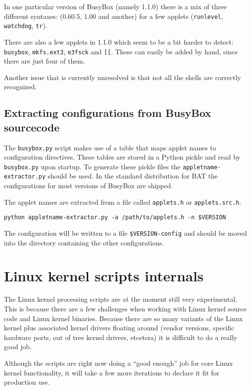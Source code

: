 \documentclass[10pt]{article}
\begin{document}
In one particular version of BusyBox (namely 1.1.0) there is a mix of three
different syntaxes: (0.60.5, 1.00 and another) for a few applets
(\texttt{runlevel}, \texttt{watchdog}, \texttt{tr}).

There are also a few applets in 1.1.0 which seem to be a bit harder to detect:
\texttt{busybox}, \texttt{mkfs.ext3}, \texttt{e3fsck} and \texttt{[[}. These
can easily be added by hand, since there are just four of them.

Another issue that is currently unresolved is that not all the shells are
correctly recognized.

\subsection{Extracting configurations from BusyBox sourcecode}

The \texttt{busybox.py} script makes use of a table that maps applet names to
configuration directives. These tables are stored in a Python pickle and read
by \texttt{busybox.py} upon startup. To generate these pickle files the
\texttt{appletname-extractor.py} should be used. In the standard distribution
for BAT the configurations for most versions of BusyBox are shipped.

The applet names are extracted from a file called \texttt{applets.h} or
\texttt{applets.src.h}.

\begin{verbatim}
python appletname-extractor.py -a /path/to/applets.h -n $VERSION
\end{verbatim}

The configuration will be written to a file \texttt{\$VERSION-config} and
should be moved into the directory containing the other configurations.

\section{Linux kernel scripts internals}

The Linux kernel processing scripts are at the moment still very experimental.
This is because there are a few challenges when working with Linux kernel
source code and Linux kernel binaries. Because there are so many variants of
the Linux kernel plus associated kernel drivers floating around (vendor
versions, specific hardware ports, out of tree kernel drivers, etcetera) it is
difficult to do a really good job.

Although the scripts are right now doing a ``good enough'' job for core Linux
kernel functionality, it will take a few more iterations to declare it fit for
production use.
\end{document}
